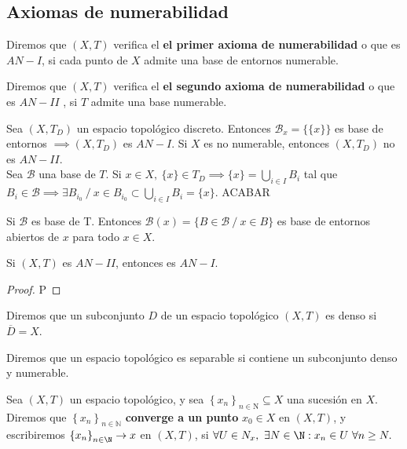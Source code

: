 \subsection{Axiomas de numerabilidad}
\begin{ndef}
  Diremos que $(X,T)$ verifica el \textbf{el primer axioma de numerabilidad} o que es $AN-I$, si cada punto de $X$ admite una base de entornos numerable.
\end{ndef}

\begin{ndef}
  Diremos que $(X,T)$ verifica el \textbf{el segundo axioma de numerabilidad} o que es $AN-II$  , si $T$ admite una base numerable.
\end{ndef}

\begin{exmp}
  Sea $(X,T_D)$ un espacio topológico discreto. Entonces $\mathcal{B}_x=\{\{x\}\}$ es base de entornos $\implies (X,T_D)$ es $AN-I$. Si $X$ es no numerable, entonces  $(X,T_D)$ no es $AN-II$.\\

  Sea $\mathcal{B}$ una base de $T$. Si $x \in X,\ \{x\} \in T_D \implies \{x\} = \bigcup_{i \in I}B_i$ tal que $B_i \in \mathcal{B} \implies \exists B_{i_0}\ /\ x \in B_{i_0} \subset \bigcup_{i \in I} B_i = \{x\}$. ACABAR
\end{exmp}

\begin{lema}
  Si $\mathcal{B}$ es base de T. Entonces $\mathcal{B}(x) = \{B \in  \mathcal{B}\ /\ x \in B\}$ es base de entornos abiertos de $x$ para todo $x \in X$.
\end{lema}

\begin{ncor}
  Si $(X,T)$ es $AN-II$, entonces es $AN-I$.
\end{ncor}
\begin{proof}
  P
\end{proof}

\begin{ndef}
  Diremos que un subconjunto $D$ de un espacio topológico $(X,T)$ es denso si $\overline{D}=X$.
\end{ndef}

\begin{ndef}[Separable]
  Diremos que un espacio topológico es separable si contiene un subconjunto denso y numerable.
\end{ndef}
\begin{ndef}[Convergencia]
Sea $(X, T)$ un espacio topológico, y sea $\left\{x_{n}\right\}_{n \in \mathrm{N}} \subseteq X$ una sucesión en $X$. Diremos que $\left\{x_{n}\right\}_{n \in \mathbb{N}}$ \textbf{converge a un punto} $x_{0} \in X$ en $(X, T)$, y escribiremos $\left\{x_{n}\right\}_{n \in \N} \rightarrow x$ en $(X, T)$, si $\forall U \in N_{x},\ \exists N \in \N: x_{n} \in U\ \forall n \geq N .$
\end{ndef}

